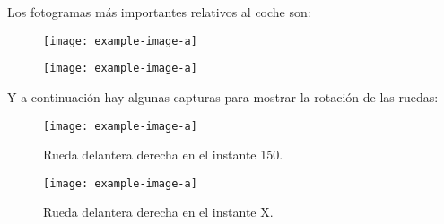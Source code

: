 Los fotogramas más importantes relativos al coche son:


\begin{figure}[H]
    \centering
   \texttt{[image: example-image-a]}
\end{figure}

\begin{figure}[H]
    \centering
   \texttt{[image: example-image-a]}
\end{figure}

Y a continuación hay algunas capturas para mostrar la rotación de las ruedas:

\begin{figure}[H]
    \centering
   \texttt{[image: example-image-a]}
   \caption{Rueda delantera derecha en el instante 150.}
\end{figure}

\begin{figure}[H]
    \centering
   \texttt{[image: example-image-a]}
   \caption{Rueda delantera derecha en el instante X.}
\end{figure}